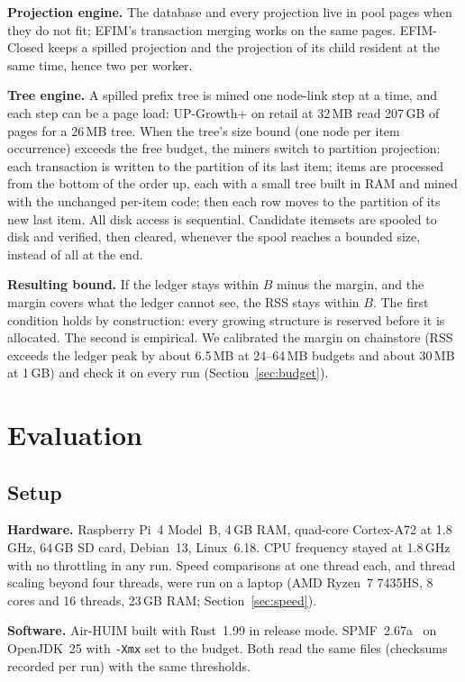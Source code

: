 \documentclass[conference]{IEEEtran}
\begin{document}
\textbf{Projection engine.} The database and every projection live in pool pages when they do not
fit; EFIM's transaction merging works on the same pages. EFIM-Closed keeps a spilled projection
and the projection of its child resident at the same time, hence two per worker.

\textbf{Tree engine.} A spilled prefix tree is mined one node-link step at a time, and each step
can be a page load: UP-Growth+ on retail at 32\,MB read 207\,GB of pages for a 26\,MB tree. When the
tree's size bound (one node per item occurrence) exceeds the free budget, the miners switch to
partition projection: each transaction is written to the partition of its last item; items are
processed from the bottom of the order up, each with a small tree built in RAM and mined with the
unchanged per-item code; then each row moves to the partition of its new last item. All disk access
is sequential. Candidate itemsets are spooled to disk and verified, then cleared, whenever the spool
reaches a bounded size, instead of all at the end.

\textbf{Resulting bound.} If the ledger stays within $B$ minus the margin, and the margin covers
what the ledger cannot see, the RSS stays within $B$. The first condition holds by construction:
every growing structure is reserved before it is allocated. The second is empirical. We calibrated
the margin on chainstore (RSS exceeds the ledger peak by about 6.5\,MB at 24--64\,MB budgets and
about 30\,MB at 1\,GB) and check it on every run (Section~\ref{sec:budget}).

\section{Evaluation}\label{sec:eval}

\subsection{Setup}

\textbf{Hardware.} Raspberry Pi~4 Model~B, 4\,GB RAM, quad-core Cortex-A72 at 1.8\,GHz, 64\,GB SD
card, Debian~13, Linux~6.18. CPU frequency stayed at 1.8\,GHz with no throttling in any run.
Speed comparisons at one thread each, and thread scaling beyond four threads, were run on a laptop
(AMD Ryzen~7 7435HS, 8 cores and 16 threads, 23\,GB RAM; Section~\ref{sec:speed}).

\textbf{Software.} Air-HUIM built with Rust~1.99 in release mode. SPMF~2.67a~\cite{spmf2016} on
OpenJDK~25 with \texttt{-Xmx} set to the budget. Both read the same files (checksums recorded per
run) with the same thresholds.
\end{document}
